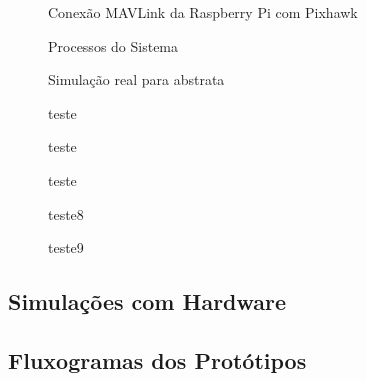 \begin{figure}[htpb]
	\centering
	\caption{Conexão MAVLink da Raspberry Pi com Pixhawk}
	\fontsize{9pt}{12pt}\selectfont
	\def\svgwidth{15cm}
	
	\label{fig:mavlink}
\end{figure}

\begin{figure}[htpb]
	\centering
	\caption{Processos do Sistema}
	\fontsize{9pt}{12pt}\selectfont
	\def\svgwidth{15cm}
	
	\label{fig:pross}
\end{figure}

\begin{figure}[htpb]
	\centering
	\caption{Simulação real para abstrata}
	\fontsize{9pt}{12pt}\selectfont
	\def\svgwidth{15cm}
	
	\label{fig:simul}
\end{figure}
\begin{figure}
	\caption{teste}
	
\label{fig:teste5}
\end{figure}

\begin{figure}
	\caption{teste}
	
	\label{fig:teste6}
\end{figure}

%	
\begin{figure}
	\caption{teste}
	
	\label{fig:teste7}
\end{figure}%




\begin{figure}
	\caption{teste8}
	
	\label{fig:teste8}
\end{figure}

\begin{figure}
	\caption{teste9}
	
	\label{fig:teste9}
\end{figure}
\subsection{Simulações com Hardware}



\subsection{Fluxogramas dos Protótipos}

